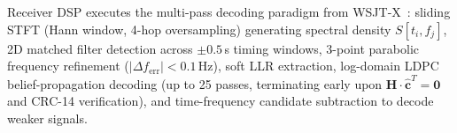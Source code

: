 Receiver DSP executes the multi-pass decoding paradigm from WSJT-X~\cite{ft8,wsjtx}: sliding STFT (Hann window, 4-hop oversampling) generating spectral density $S[t_i, f_j]$, 2D matched filter detection across $\pm 0.5$\,s timing windows, 3-point parabolic frequency refinement ($|\Delta f_{\text{err}}| < 0.1$\,Hz), soft LLR extraction, log-domain LDPC belief-propagation decoding (up to 25 passes, terminating early upon $\mathbf{H}\cdot\hat{\mathbf{c}}^T = \mathbf{0}$ and CRC-14 verification), and time-frequency candidate subtraction to decode weaker signals.



\pagebreak
